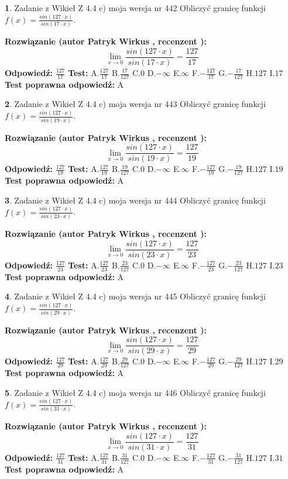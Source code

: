 \documentclass[12pt, a4paper]{article}
\theoremstyle{definition} %
\newtheorem{zad}{}
\newcommand{\zadStart}[1]{\begin{zad}#1\newline}
\newcommand{\zadStop}{\end{zad}}
\newcommand{\rozwStart}[2]{\noindent \textbf{Rozwiązanie (autor #1 , recenzent #2): }\newline}
\newcommand{\rozwStop}{\newline}
\newcommand{\odpStart}{\noindent \textbf{Odpowiedź:}\newline}
\newcommand{\odpStop}{\newline}
\newcommand{\testStart}{\noindent \textbf{Test:}\newline}
\newcommand{\testStop}{\newline}
\newcommand{\kluczStart}{\noindent \textbf{Test poprawna odpowiedź:}\newline}
\newcommand{\kluczStop}{\newline}
\begin{document}
\zadStart{Zadanie z Wikieł Z 4.4 c) moja wersja nr 442}
Obliczyć granicę funkcji $f(x)=\frac{sin(127\cdot x)}{sin(17\cdot x)}$.
\zadStop
\rozwStart{Patryk Wirkus}{}
$$\lim\limits_{x\to 0}\frac{sin(127\cdot x)}{sin(17\cdot x)}=
\frac{127}{17}$$
\rozwStop
\odpStart
$\frac{127}{17}$
\odpStop
\testStart
A.$\frac{127}{17}$
B.$\frac{17}{127}$
C.$0$
D.$-\infty$
E.$\infty$
F.$-\frac{127}{17}$
G.$-\frac{17}{127}$
H.$127$
I.$17$
\testStop
\kluczStart
A
\kluczStop



\zadStart{Zadanie z Wikieł Z 4.4 c) moja wersja nr 443}
Obliczyć granicę funkcji $f(x)=\frac{sin(127\cdot x)}{sin(19\cdot x)}$.
\zadStop
\rozwStart{Patryk Wirkus}{}
$$\lim\limits_{x\to 0}\frac{sin(127\cdot x)}{sin(19\cdot x)}=
\frac{127}{19}$$
\rozwStop
\odpStart
$\frac{127}{19}$
\odpStop
\testStart
A.$\frac{127}{19}$
B.$\frac{19}{127}$
C.$0$
D.$-\infty$
E.$\infty$
F.$-\frac{127}{19}$
G.$-\frac{19}{127}$
H.$127$
I.$19$
\testStop
\kluczStart
A
\kluczStop



\zadStart{Zadanie z Wikieł Z 4.4 c) moja wersja nr 444}
Obliczyć granicę funkcji $f(x)=\frac{sin(127\cdot x)}{sin(23\cdot x)}$.
\zadStop
\rozwStart{Patryk Wirkus}{}
$$\lim\limits_{x\to 0}\frac{sin(127\cdot x)}{sin(23\cdot x)}=
\frac{127}{23}$$
\rozwStop
\odpStart
$\frac{127}{23}$
\odpStop
\testStart
A.$\frac{127}{23}$
B.$\frac{23}{127}$
C.$0$
D.$-\infty$
E.$\infty$
F.$-\frac{127}{23}$
G.$-\frac{23}{127}$
H.$127$
I.$23$
\testStop
\kluczStart
A
\kluczStop



\zadStart{Zadanie z Wikieł Z 4.4 c) moja wersja nr 445}
Obliczyć granicę funkcji $f(x)=\frac{sin(127\cdot x)}{sin(29\cdot x)}$.
\zadStop
\rozwStart{Patryk Wirkus}{}
$$\lim\limits_{x\to 0}\frac{sin(127\cdot x)}{sin(29\cdot x)}=
\frac{127}{29}$$
\rozwStop
\odpStart
$\frac{127}{29}$
\odpStop
\testStart
A.$\frac{127}{29}$
B.$\frac{29}{127}$
C.$0$
D.$-\infty$
E.$\infty$
F.$-\frac{127}{29}$
G.$-\frac{29}{127}$
H.$127$
I.$29$
\testStop
\kluczStart
A
\kluczStop



\zadStart{Zadanie z Wikieł Z 4.4 c) moja wersja nr 446}
Obliczyć granicę funkcji $f(x)=\frac{sin(127\cdot x)}{sin(31\cdot x)}$.
\zadStop
\rozwStart{Patryk Wirkus}{}
$$\lim\limits_{x\to 0}\frac{sin(127\cdot x)}{sin(31\cdot x)}=
\frac{127}{31}$$
\rozwStop
\odpStart
$\frac{127}{31}$
\odpStop
\testStart
A.$\frac{127}{31}$
B.$\frac{31}{127}$
C.$0$
D.$-\infty$
E.$\infty$
F.$-\frac{127}{31}$
G.$-\frac{31}{127}$
H.$127$
I.$31$
\testStop
\kluczStart
A
\kluczStop
\end{document}
